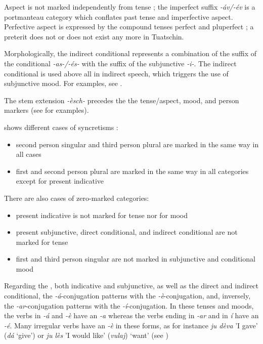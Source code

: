 Aspect is not marked independently from tense ; the imperfect suffix \textit{-áv/}\textit{-év} is a portmanteau category which conflates past tense and imperfective aspect. Perfective aspect is expressed by the compound tenses perfect and pluperfect ; a preterit does not or does not exist any more in Tuatschin.

Morphologically, the indirect conditional represents a combination of the suffix of the conditional \textit{-as-/-és-} with the suffix of the subjunctive \textit{-i-}. The indirect conditional is used above all in indirect speech, which  triggers the use of subjunctive mood. For examples, see .

The stem extension \textit{-èsch-} precedes the the tense/aspect, mood, and person markers (see  for examples).

\newpage
{} shows different cases of syncretisms :

 \begin{itemize}
\item second person singular and third person plural are marked in the same way in all cases
\item first and second person plural are marked in the same way in all categories except for present indicative
\end{itemize}

There are also cases of zero-marked categories:

\begin{itemize}
\item present indicative is not marked for tense nor for mood
\item present subjunctive, direct conditional, and indirect conditional are not marked for tense
\item first and third person singular are not marked in subjunctive and conditional mood

\end{itemize}

Regarding the , both indicative and subjunctive, as well as the direct and indirect conditional, the \textit{-á}-conjugation patterns with the \textit{-è}-conjugation, and, inversely, the \textit{-ar}-conjugation patterns with the \textit{-í}-conjugation. In these tenses and moods,  the verbs  in \textit{-á} and \textit{-è} have an \textit{-a} whereas the verbs ending in \textit{-ar} and in \textit{í} have an \textit{-é}. Many irregular verbs have  an \textit{-è} in these forms, as for instance \textit{ju dèva} 'I gave' (\textit{dá} `give') or \textit{ju lès} 'I would like' (\textit{vulaj}) `want' (see )

